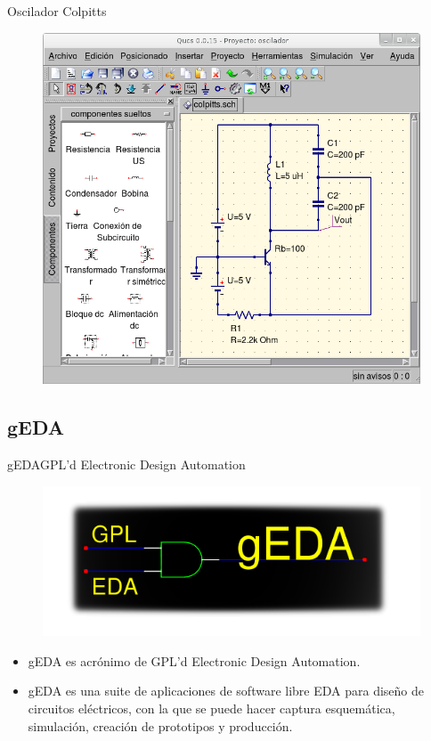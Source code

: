 \documentclass{beamer}
\begin{document}
\begin{frame}{Oscilador Colpitts}
  \begin{figure}
    \centering
    \includegraphics[scale=0.4]{qucs/img/qucs-colpitts.png}
  \end{figure}
\end{frame}

\subsection[gEDA - \url{http://www.gpleda.org}]{gEDA}

\begin{frame}{gEDA}{GPL'd Electronic Design Automation}
  \begin{figure}[!h]
    \centering
    \includegraphics[scale=0.4]{geda/img/geda.png}
  \end{figure}
  \begin{itemize}
  \item gEDA es acrónimo de GPL'd Electronic Design Automation.
  \item gEDA es una suite de aplicaciones de software libre EDA para diseño de circuitos eléctricos, con la que se puede hacer captura esquemática, simulación, creación de prototipos y producción.
  \end{itemize}
\end{frame}
\end{document}
